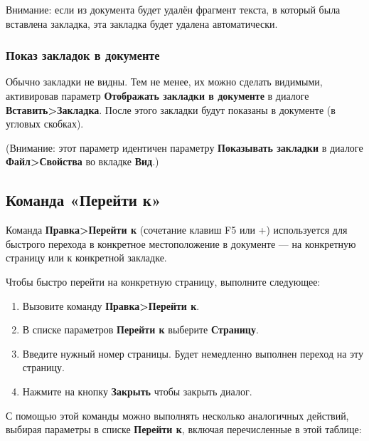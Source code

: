 \documentclass[a4paper,10pt]{article}
\begin{document}
Внимание: если из документа будет удалён фрагмент текста, в который была вставлена закладка, эта закладка будет удалена автоматически.

\subsubsection{Показ закладок в документе}
Обычно закладки не видны. Тем не менее, их можно сделать видимыми, активировав параметр \textbf{Отображать закладки в документе} в диалоге \textbf{Вставить>Закладка}. После этого закладки будут показаны в документе (в угловых скобках).

(Внимание: этот параметр идентичен параметру \textbf{Показывать закладки} в диалоге \textbf{Файл>Свойства} во вкладке \textbf{Вид}.)

\subsection{Команда «Перейти к»}
Команда \textbf{Правка>Перейти к} (сочетание клавиш F5 или +) используется для быстрого перехода в конкретное местоположение в документе --- на конкретную страницу или к конкретной закладке.

Чтобы быстро перейти на конкретную страницу, выполните следующее:
\begin{enumerate}
 \item Вызовите команду \textbf{Правка>Перейти к}.
 \item В списке параметров \textbf{Перейти к} выберите \textbf{Страницу}.
 \item Введите нужный номер страницы. Будет немедленно выполнен переход на эту страницу.
 \item Нажмите на кнопку \textbf{Закрыть} чтобы закрыть диалог.
\end{enumerate}

С помощью этой команды можно выполнять несколько аналогичных действий, выбирая параметры в списке \textbf{Перейти к}, включая перечисленные в этой таблице:
\end{document}
